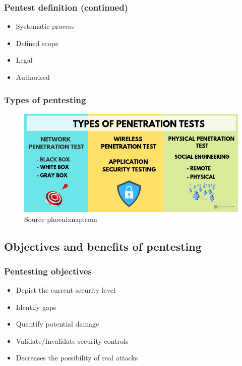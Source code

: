 \begin{frame}
    \frametitle{Pentest definition (continued)}

    \note[item]{
    }

	\begin{itemize}
		\item Systematic process
		\item Defined scope
		\item Legal
		\item Authorised
	\end{itemize}	    
\end{frame}

\begin{frame}
    \frametitle{Types of pentesting}

    \note[item]{
    }

	\begin{figure}
		\centering	
		\includegraphics[width=\linewidth]{types-of-pen-testing.png}
		\caption{Source phoenixnap.com}
	\end{figure}    
\end{frame}

\subsection{Objectives and benefits of pentesting}

\begin{frame}
    \frametitle{Pentesting objectives}
    
    \note[item]{
    }
    
    	\begin{itemize}
    		\item Depict the current security level
    		\item Identify gaps
    		\item Quantify potential damage
		\item Validate/Invalidate security controls
    		\item Decreases the possibility of real attacks
    	\end{itemize}
\end{frame}

